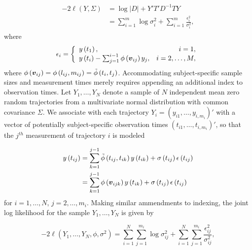 \begin{align}
\begin{split} \label{eq:loglik-cholesky-form}
-2\ell\left( Y, \Sigma \right) &= \log \vert D \vert + Y' T' D^{-1} T Y \\
&= \sum_{i = 1}^m \log \sigma_i^2  + \sum_{i = 1}^m \frac {\epsilon_i^2}{\sigma_i^2},
\end{split}
\end{align}
\noindent
where 
\begin{equation} \label{eq:loglik-cholesky-form}
\epsilon_i = \left\{\begin{array}{lr}y\left(t_1\right), & i = 1, \\
y\left(t_i\right) - \sum_{j = 1}^{i-1} \phi\left(\mbox{\boldmath $v$}_{ij}\right) y_j, & i= 2, \dots, M, \\
\end{array} \right.
\end{equation}
\noindent
where $\phi\left(\mbox{\boldmath $v$}_{ij}\right) = \phi\left(l_{ij},m_{ij}\right) = \tilde{\phi}\left(t_i,t_j\right)$.  Accommodating subject-specific sample sizes and measurement times merely requires appending an additional index to observation times. Let  $Y_1, \dots, Y_N$ denote a sample of $N$ independent mean zero random trajectories from a  multivariate normal distribution with common covariance $\Sigma$. We associate with each trajectory $Y_i = \left(y_{i1}, \dots, y_{i,m_i}\right)'$ with a vector of potentially subject-specific observation times $\left(t_{i1}, \dots, t_{i,m_i}\right)'$, so that the $j^{th}$ measurement of trajectory $i$ is modeled

\begin{align}
\begin{split} \label{eq:cholesky-regression-model-2} 
y\left(t_{ij} \right)  &= \sum_{k=1}^{j-1} \tilde{\phi}\left(t_{ij} ,t_{ik}\right) y\left(t_{ik}\right) + \sigma\left(t_{ij}\right)\epsilon\left(t_{ij}\right)  \\
&= \sum_{k=1}^{j-1} \phi\left(\mbox{\boldmath $v$}_{ijk}\right) y\left(t_{ik}\right) + \sigma\left(t_{ij}\right)\epsilon\left(t_{ij}\right)
\end{split}
\end{align}
\noindent
for $i = 1,\dots, N$, $j = 2,\dots, m_i$.
\noindent
Making similar ammendments to indexing, the joint log likelihood for the sample $Y_1, \dots, Y_N$ is given by  

\begin{equation} \label{eq:joint-loglik}
-2\ell\left( Y_1,\dots, Y_N, \phi, \sigma^2 \right) = \sum_{i = 1}^N \sum_{j = 1}^{m_i} \log \sigma_{ij}^2  + \sum_{i = 1}^N \sum_{j = 1}^{m_i} \frac {\epsilon_{ij}^2}{\sigma_{ij}^2},
\end{equation}

